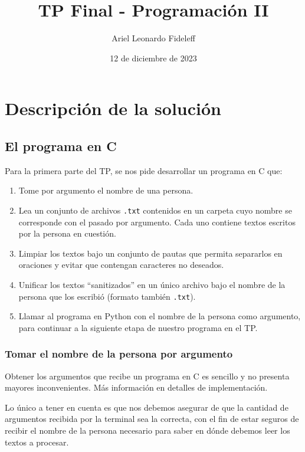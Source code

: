 \documentclass[a4paper]{article}
\title{TP Final - Programación II}
\author{Ariel Leonardo Fideleff}
\date{12 de diciembre de 2023}
\begin{document}
\maketitle

\section{Descripción de la solución}


\subsection{El programa en C}

\noindent Para la primera parte del TP, se nos pide desarrollar un programa en C que:

\begin{enumerate}
    \item Tome por argumento el nombre de una persona.
    \item Lea un conjunto de archivos \texttt{.txt} contenidos en un carpeta cuyo nombre se corresponde con el pasado por argumento. Cada uno contiene textos escritos por la persona en cuestión.
    \item Limpiar los textos bajo un conjunto de pautas que permita separarlos en oraciones y evitar que contengan caracteres no deseados.
    \item Unificar los textos ``sanitizados'' en un único archivo bajo el nombre de la persona que los escribió (formato también \texttt{.txt}).
    \item Llamar al programa en Python con el nombre de la persona como argumento, para continuar a la siguiente etapa de nuestro programa en el TP.
\end{enumerate}

\subsubsection{Tomar el nombre de la persona por argumento}

Obtener los argumentos que recibe un programa en C es sencillo y no presenta mayores inconvenientes. Más información en detalles de implementación. %

Lo único a tener en cuenta es que nos debemos asegurar de que la cantidad de argumentos recibida por la terminal sea la correcta, con el fin de estar seguros de recibir el nombre de la persona necesario para saber en dónde debemos leer los textos a procesar.
\end{document}
